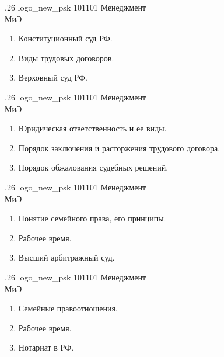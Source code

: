 \documentclass[
	12pt,
	a4paper,
	]
	{article}
\newcommand{\shapkFull}{
	\shapk
		{.26}
		{logo_new_psk}
		{101101}
		{Менеджмент\\}
		{МиЭ}
		{}
}
\begin{document}
\newpage


\shapkFull
\setcounter{zad}{0}

\begin{enumerate}
	\item Конституционный суд РФ.

	\item Виды трудовых договоров.

	\item Верховный суд РФ.

\end{enumerate}

\newpage


\shapkFull
\setcounter{zad}{0}

\begin{enumerate}
	\item Юридическая ответственность и ее виды.

	\item Порядок заключения и расторжения трудового договора.

	\item Порядок обжалования судебных решений.

\end{enumerate}

\newpage


\shapkFull
\setcounter{zad}{0}

\begin{enumerate}
	\item Понятие семейного права, его принципы.

	\item Рабочее время.

	\item Высший арбитражный суд.

\end{enumerate}

\newpage


\shapkFull
\setcounter{zad}{0}

\begin{enumerate}
	\item Семейные правоотношения.

	\item Рабочее время.

	\item Нотариат в РФ.

\end{enumerate}
\end{document}
